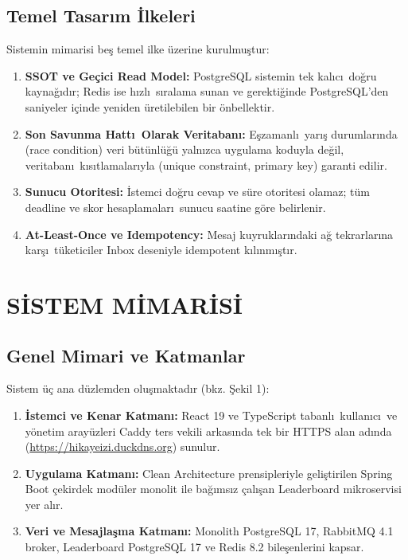 \documentclass[conference,a4paper]{IEEEtran}
\begin{document}
\subsection{Temel Tasar\i m \.{I}lkeleri}
Sistemin mimarisi be\c{s} temel ilke \"{u}zerine kurulmu\c{s}tur:
\begin{enumerate}
    \item \textbf{SSOT ve Ge\c{c}ici Read Model:} PostgreSQL sistemin tek kal\i c\i\ do\u{g}ru kayna\u{g}\i d\i r; Redis ise h\i zl\i\ s\i ralama sunan ve gerekti\u{g}inde PostgreSQL'den saniyeler i\c{c}inde yeniden \"{u}retilebilen bir \"{o}nbellektir.
    \item \textbf{Son Savunma Hatt\i\ Olarak Veritaban\i:} E\c{s}zamanl\i\ yar\i\c{s} durumlar\i nda (race condition) veri b\"{u}t\"{u}nl\"{u}\u{g}\"{u} yaln\i zca uygulama koduyla de\u{g}il, veritaban\i\ k\i s\i tlamalar\i yla (unique constraint, primary key) garanti edilir.
    \item \textbf{Sunucu Otoritesi:} \.{I}stemci do\u{g}ru cevap ve s\"{u}re otoritesi olamaz; t\"{u}m deadline ve skor hesaplamalar\i\ sunucu saatine g\"{o}re belirlenir.
    \item \textbf{At-Least-Once ve Idempotency:} Mesaj kuyruklar\i ndaki a\u{g} tekrarlar\i na kar\c{s}\i\ t\"{u}keticiler Inbox deseniyle idempotent k\i l\i nm\i\c{s}t\i r.
\end{enumerate}

\section{S\.{I}STEM M\.{I}MAR\.{I}S\.{I}}

\subsection{Genel Mimari ve Katmanlar}
Sistem \"{u}\c{c} ana d\"{u}zlemden olu\c{s}maktad\i r (bkz. \c{S}ekil 1):
\begin{enumerate}
    \item \textbf{\.{I}stemci ve Kenar Katman\i:} React 19 ve TypeScript tabanl\i\ kullan\i c\i\ ve y\"{o}netim aray\"{u}zleri Caddy ters vekili arkas\i nda tek bir HTTPS alan ad\i nda (\url{https://hikayeizi.duckdns.org}) sunulur.
    \item \textbf{Uygulama Katman\i:} Clean Architecture prensipleriyle geli\c{s}tirilen Spring Boot \c{c}ekirdek mod\"{u}ler monolit ile ba\u{g}\i ms\i z \c{c}al\i\c{s}an Leaderboard mikroservisi yer al\i r.
    \item \textbf{Veri ve Mesajla\c{s}ma Katman\i:} Monolith PostgreSQL 17, RabbitMQ 4.1 broker, Leaderboard PostgreSQL 17 ve Redis 8.2 bile\c{s}enlerini kapsar.
\end{enumerate}
\end{document}
